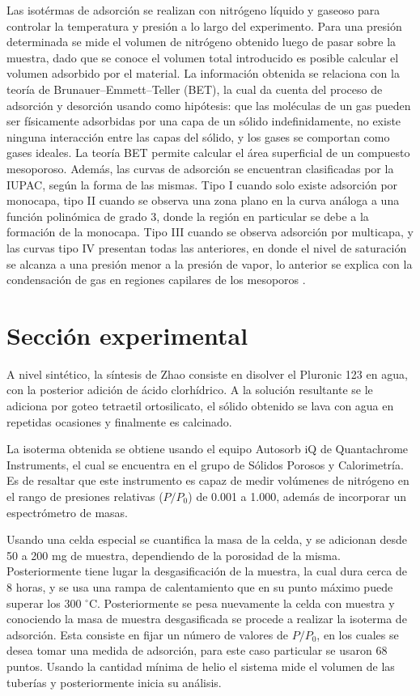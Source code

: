 \documentclass[fleqn,11pt]{SelfArx}
\begin{document}
	Las isot\'ermas de adsorci\'on se realizan con nitr\'ogeno l\'iquido y gaseoso para controlar la temperatura y presi\'on a lo largo del experimento. Para una presi\'on determinada se mide el volumen de nitr\'ogeno obtenido luego de pasar sobre la muestra, dado que se conoce el volumen total introducido es posible calcular el volumen adsorbido por el material. La informaci\'on obtenida se relaciona con la teor\'ia de Brunauer–Emmett–Teller (BET), la cual da cuenta del proceso de adsorci\'on y desorci\'on usando como hip\'otesis: que las mol\'eculas de un gas pueden ser f\'isicamente adsorbidas por una capa de un s\'olido indefinidamente, no existe ninguna interacci\'on entre las capas del s\'olido, y los gases se comportan como gases ideales. La teor\'ia BET permite calcular el \'area superficial de un compuesto mesoporoso. Adem\'as, las curvas de adsorci\'on se encuentran clasificadas por la IUPAC, seg\'un la forma de las mismas. Tipo I cuando solo existe adsorci\'on por monocapa, tipo II cuando se observa una zona plano en la curva an\'aloga a una funci\'on polin\'omica de grado 3, donde la regi\'on en particular se debe a la formaci\'on de la monocapa. Tipo III cuando se observa adsorci\'on por multicapa, y las curvas tipo IV presentan todas las anteriores, en donde el nivel de saturaci\'on se alcanza a una presi\'on menor a la presi\'on de vapor, lo anterior se explica con la condensaci\'on de gas en  regiones capilares de los mesoporos \cite{sing_2001}.
	
	\section{Secci\'on experimental}
	A nivel sint\'etico, la s\'intesis de Zhao consiste en disolver el Pluronic 123 en agua, con la posterior adici\'on de \'acido clorh\'idrico. A la soluci\'on resultante se le adiciona por goteo tetraetil ortosilicato, el s\'olido obtenido se lava con agua en repetidas ocasiones y finalmente es calcinado.
	
	La isoterma obtenida se obtiene usando el equipo Autosorb iQ de Quantachrome Instruments, el cual se encuentra en el grupo de Sólidos Porosos y Calorimetría. Es de resaltar que este instrumento es capaz de medir vol\'umenes de nitr\'ogeno en el rango de presiones relativas ($P/P_0$) de 0.001 a 1.000, adem\'as de incorporar un espectr\'ometro de masas.
	
	Usando una celda especial se cuantifica la masa de la celda, y se adicionan desde 50 a 200 mg de muestra, dependiendo de la porosidad de la misma. Posteriormente tiene lugar la desgasificaci\'on de la muestra, la cual dura cerca de 8 horas, y se usa una rampa de calentamiento que en su punto m\'aximo puede superar los 300 $^\circ$C. Posteriormente se pesa nuevamente la celda con muestra y conociendo la masa de muestra desgasificada se procede a realizar la isoterma de adsorci\'on. Esta consiste en fijar un n\'umero de valores de $P/P_0$, en los cuales se desea tomar una medida de adsorci\'on, para este caso particular se usaron 68 puntos. Usando la cantidad m\'inima de helio el sistema mide el volumen de las tuber\'ias y posteriormente inicia su an\'alisis.	
	
\end{document}
